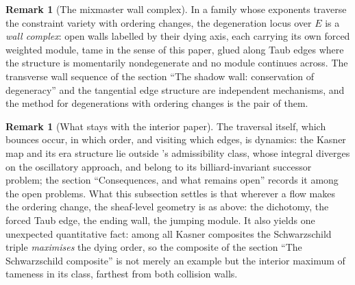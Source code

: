 \documentclass[11pt]{article}
\theoremstyle{definition}
\newtheorem{remark}[theorem]{Remark}
\theoremstyle{plain}
\begin{document}
\begin{remark}[The mixmaster wall complex]\label{c:note.sheaf.mixmaster-wall-complex}
In a family whose exponents traverse the constraint variety with ordering changes, the degeneration locus over $E$ is a \emph{wall complex}: open walls labelled by their dying axis, each carrying its own forced weighted module, tame in the sense of this paper, glued along Taub edges where the structure is momentarily nondegenerate and no module continues across. The transverse wall sequence of the section ``The shadow wall: conservation of degeneracy'' and the tangential edge structure are independent mechanisms, and the method for degenerations with ordering changes is the pair of them.
\end{remark}

\begin{remark}[What stays with the interior paper]\label{c:note.sheaf.what-stays-interior-paper}
The traversal itself, which bounces occur, in which order, and visiting which edges, is dynamics: the Kasner map and its era structure lie outside \cite{ButlerT6}'s admissibility class, whose integral diverges on the oscillatory approach, and belong to its billiard-invariant successor problem; the section ``Consequences, and what remains open'' records it among the open problems. What this subsection settles is that wherever a flow makes the ordering change, the sheaf-level geometry is as above: the dichotomy, the forced Taub edge, the ending wall, the jumping module. It also yields one unexpected quantitative fact: among all Kasner composites the Schwarzschild triple \emph{maximises} the dying order, so the composite of the section ``The Schwarzschild composite'' is not merely an example but the interior maximum of tameness in its class, farthest from both collision walls.
\end{remark}
\end{document}
